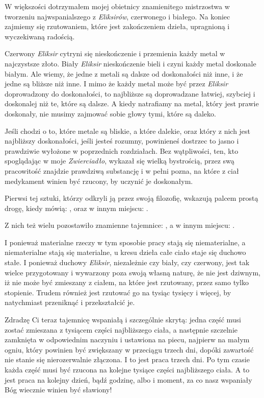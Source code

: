 W większości dotrzymałem mojej obietnicy znamienitego mistrzostwa w tworzeniu najwspanialszego z \textit{Eliksirów}, czerwonego i białego. Na koniec zajmiemy się rzutowaniem, które jest zakończeniem dzieła, upragnioną i wyczekiwaną radością. 

Czerwony \textit{Eliksir} cytryni się nieskończenie i przemienia każdy metal w najczystsze złoto. Biały \textit{Eliksir} nieskończenie bieli i czyni każdy metal doskonale białym. Ale wiemy, że jedne z metali są dalsze od doskonałości niż inne, i że jedne są bliższe niż inne. I mimo że każdy metal może być przez \textit{Eliksir} doprowadzony do doskonałości, to najbliższe są doprowadzane łatwiej, szybciej i doskonalej niż te, które są dalsze. A kiedy natrafiamy na metal, który jest prawie doskonały,  nie musimy zajmować sobie głowy tymi, które są daleko. 


Jeśli chodzi o to, które metale są bliskie, a które dalekie, oraz który z nich jest najbliższy doskonałości, jeśli jesteś rozumny, powinieneś dostrzec to jasno i prawdziwie wyłożone w poprzednich rozdziałach. Bez wątpliwości, ten, kto spoglądając w moje \textit{Zwierciadło}, wykazał się wielką bystrością, przez swą pracowitość znajdzie prawdziwą substancję i w pełni pozna, na które z ciał medykament winien być rzucony, by uczynić je doskonałym. 

Pierwsi tej sztuki, którzy odkryli ją przez swoją filozofię, wskazują palcem prostą drogę, kiedy mówią: , oraz w innym miejscu: . 

Z nich też wielu pozostawiło znamienne tajemnice: , a w innym miejscu: .

I ponieważ materialne rzeczy w tym sposobie pracy stają się niematerialne, a niematerialne stają się materialne, u kresu dzieła całe ciało staje się duchowo stałe. I ponieważ duchowy \textit{Eliksir}, niezależnie czy biały, czy czerwony, jest tak wielce przygotowany i wywarzony poza swoją własną naturę, że nie jest dziwnym, iż nie może być zmieszany z ciałem, na które jest rzutowany, przez samo tylko stopienie. Trudem również jest rzutować go na tysiąc tysięcy i więcej, by natychmiast przeniknąć i przekształcić je.

Zdradzę Ci teraz tajemnicę wspaniałą i szczególnie skrytą: jedna część musi zostać zmieszana z tysiącem części najbliższego ciała, a następnie szczelnie zamknięta w odpowiednim naczyniu i ustawiona na piecu, najpierw na małym ogniu, który powinien być zwiększany w przeciągu trzech dni, dopóki zawartość nie stanie się nierozerwalnie złączona. I to jest praca trzech dni. Po tym czasie każda część musi być rzucona na kolejne tysiące części najbliższego ciała. A to jest praca na kolejny dzień, bądź godzinę, albo i moment, za co nasz wspaniały Bóg wiecznie winien być sławiony!
